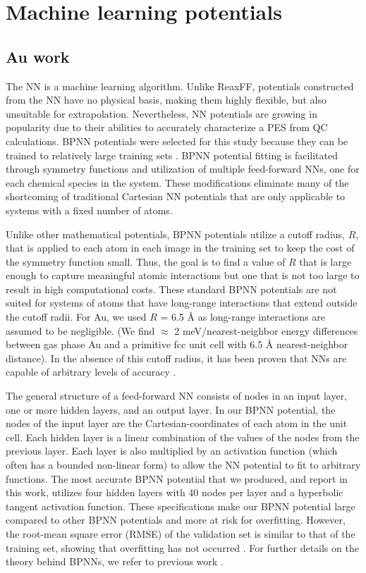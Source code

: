 \documentclass[12pt]{cmuthesis}
\begin{document}
\section{Machine learning potentials}
\label{sec:orgc0951dc}
\subsection{Au work}
\label{sec:orgfc5de9d}
The NN is a machine learning algorithm. Unlike ReaxFF, potentials constructed from the NN have no physical basis, making them highly flexible, but also unsuitable for extrapolation. Nevertheless, NN potentials are growing in popularity due to their abilities to accurately characterize a PES from QC calculations. BPNN potentials were selected for this study because they can be trained to relatively large training sets \cite{behler-2007-gener-neural}. BPNN potential fitting is facilitated through symmetry functions and utilization of multiple feed-forward NNs, one for each chemical species in the system. These modifications eliminate many of the shortcoming of traditional Cartesian NN potentials that are only applicable to systems with a fixed number of atoms.

Unlike other mathematical potentials, BPNN potentials \cite{behler-2011-atom,behler-2007-gener-neural} utilize a cutoff radius, \(R\), that is applied to each atom in each image in the training set to keep the cost of the symmetry function small. Thus, the goal is to find a value of \(R\) that is large enough to capture meaningful atomic interactions but one that is not too large to result in high computational costs. These standard BPNN potentials are not suited for systems of atoms that have long-range interactions that extend outside the cutoff radii. For Au, we used \(R\) = 6.5 \AA{} as long-range interactions are assumed to be negligible. (We find \(\approx\) 2 meV/nearest-neighbor energy differences between gas phase Au and a primitive fcc unit cell with 6.5 \AA{} nearest-neighbor distance). In the absence of this cutoff radius, it has been proven that NNs are capable of arbitrary levels of accuracy \cite{hornik-1989-multil}.

The general structure of a feed-forward NN consists of nodes in an input layer, one or more hidden layers, and an output layer. In our BPNN potential, the nodes of the input layer are the Cartesian-coordinates of each atom in the unit cell. Each hidden layer is a linear combination of the values of the nodes from the previous layer. Each layer is also multiplied by an activation function (which often has a bounded non-linear form) to allow the NN potential to fit to arbitrary functions. The most accurate BPNN potential that we produced, and report in this work, utilizes four hidden layers with 40 nodes per layer and a hyperbolic tangent activation function. These specifications make our BPNN potential large compared to other BPNN potentials and more at risk for overfitting. However, the root-mean square error (RMSE) of the validation set is similar to that of the training set, showing that overfitting has not occurred \cite{behler-2015-const}. For further details on the theory behind BPNNs, we refer to previous work \cite{behler-2007-gener-neural,behler-2011-atom}.
\end{document}
